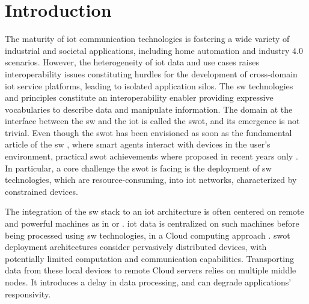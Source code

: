 \documentclass{iosart2c}
\begin{document}
\section{Introduction}

The maturity of \gls{iot} communication technologies is fostering a wide variety of industrial and societal applications, including home automation and industry 4.0 scenarios. 
However, the heterogeneity of \gls{iot} data and use cases raises interoperability issues constituting hurdles for the development of cross-domain \gls{iot} service platforms, leading to isolated application silos. 
The \gls{sw} technologies and principles constitute an interoperability enabler providing expressive vocabularies to describe data and manipulate information.
The domain at the interface between the \gls{sw} and the \gls{iot} is called the \gls{swot}, and its emergence is not trivial. 
Even though the \gls{swot} has been envisioned as soon as the fundamental article of the \gls{sw} \cite{Berners-Lee2001}, where smart agents interact with devices in the user's environment, practical \gls{swot} achievements where proposed in recent years only \cite{Pfisterer2011}.
In particular, a core challenge the \gls{swot} is facing is the deployment of \gls{sw} technologies, which are resource-consuming, into \gls{iot} networks, characterized by constrained devices. 

The integration of the \gls{sw} stack to an \gls{iot} architecture is often centered on remote and powerful machines as in \cite{Gyrard2017} or \cite{Wang2018}. 
\gls{iot} data is centralized on such machines before being processed using \gls{sw} technologies, in a Cloud computing approach \cite{Mell2011}.
\gls{swot} deployment architectures consider pervasively distributed devices, with potentially limited computation and communication capabilities. 
Transporting data from these local devices to remote Cloud servers relies on multiple middle nodes.
It introduces a delay in data processing, and can degrade applications' responsivity.
\end{document}
